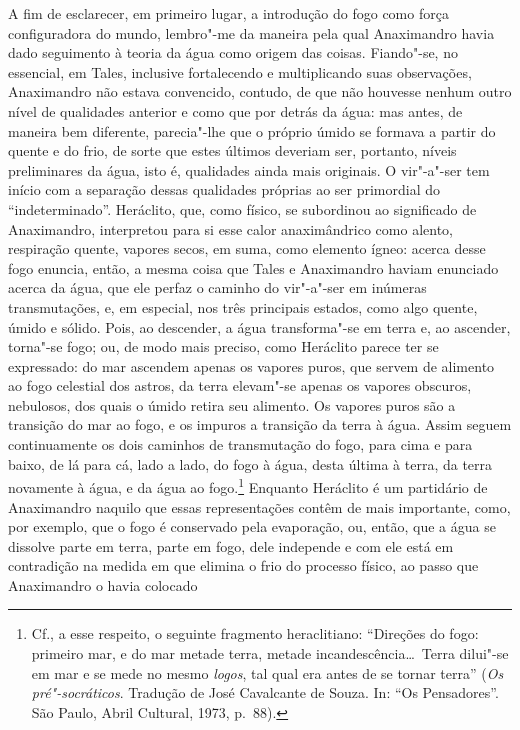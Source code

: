A fim de esclarecer, em primeiro lugar, a introdução do fogo como força
configuradora do mundo, lembro"-me da maneira pela qual Anaximandro havia
dado seguimento à teoria da água como origem das coisas. Fiando"-se, no
essencial, em Tales, inclusive fortalecendo e multiplicando suas observações,
Anaximandro não estava convencido, contudo, de que não houvesse nenhum outro
nível de qualidades anterior e como que por detrás da água: mas antes, de
maneira bem diferente, parecia"-lhe que o próprio úmido se formava a partir
do quente e do frio, de sorte que estes últimos deveriam ser, portanto,
níveis preliminares da água, isto é, qualidades ainda mais originais. O
vir"-a"-ser tem início com a separação dessas qualidades próprias ao ser
primordial do ``indeterminado''. Heráclito, que, como físico, se subordinou
ao significado de Anaximandro, interpretou para si esse calor anaximândrico
como alento, respiração quente, vapores secos, em suma, como elemento ígneo:
acerca desse fogo enuncia, então, a mesma coisa que Tales e Anaximandro
haviam enunciado acerca da água, que ele perfaz o caminho do vir"-a"-ser em
inúmeras transmutações, e, em especial, nos três principais estados, como
algo quente, úmido e sólido. Pois, ao descender, a água transforma"-se em
terra e, ao ascender, torna"-se fogo; ou, de modo mais preciso, como
Heráclito parece ter se expressado: do mar ascendem apenas os vapores puros,
que servem de alimento ao fogo celestial dos astros, da terra elevam"-se
apenas os vapores obscuros, nebulosos, dos quais o úmido retira seu alimento.
Os vapores puros são a transição do mar ao fogo, e os impuros a transição da
terra à água. Assim seguem continuamente os dois caminhos de transmutação do
fogo, para cima e para baixo, de lá para cá, lado a lado, do fogo à água,
desta última à terra, da terra novamente à água, e da água ao fogo.\footnote{Cf., 
a esse respeito, o seguinte fragmento heraclitiano: ``Direções do
fogo: primeiro mar, e do mar metade terra, metade incandescência\ldots\ Terra
dilui"-se em mar e se mede no mesmo \textit{logos}, tal qual era antes de se
tornar terra'' (\textit{Os pré"-socráticos}. Tradução de José Cavalcante de
Souza. In: ``Os Pensadores''. São Paulo, Abril Cultural, 1973, p.~88).}
Enquanto Heráclito é um partidário de Anaximandro naquilo que essas
representações contêm de mais importante, como, por exemplo, que o fogo é
conservado pela evaporação, ou, então, que a água se dissolve parte em terra,
parte em fogo, dele independe e com ele está em contradição na medida em que
elimina o frio do processo físico, ao passo que Anaximandro o havia colocado
